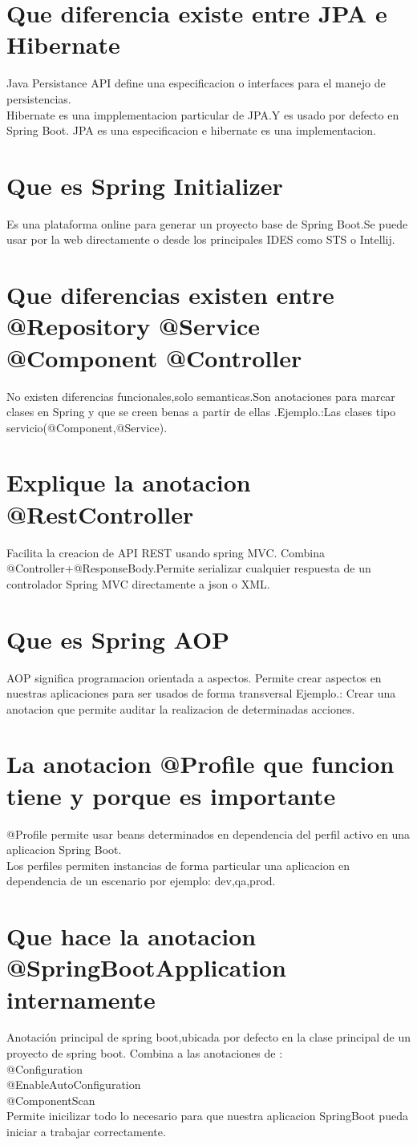 \section{Que diferencia existe entre JPA e Hibernate}
Java Persistance API define una especificacion o interfaces para el manejo de persistencias.\\
Hibernate es una impplementacion particular de JPA.Y es usado por defecto en Spring Boot.
JPA es una especificacion e hibernate es una implementacion.
\section{Que es Spring Initializer}
Es una plataforma online para generar un proyecto base de Spring Boot.Se puede usar por la web
directamente o desde los principales IDES como STS o Intellij.
\section{Que diferencias existen entre @Repository @Service
	@Component @Controller}
No existen diferencias funcionales,solo semanticas.Son anotaciones para marcar clases en Spring y que se creen benas a partir de ellas .Ejemplo.:Las clases tipo servicio(@Component,@Service).
\section{Explique la anotacion @RestController}
Facilita la creacion de API REST usando spring MVC.
Combina @Controller+@ResponseBody.Permite serializar cualquier respuesta de un controlador
Spring MVC directamente a json o XML.
\section{Que es Spring AOP}
AOP significa programacion orientada a aspectos.
Permite crear aspectos en nuestras aplicaciones para ser usados de forma transversal
Ejemplo.: Crear una anotacion que permite auditar la realizacion  de determinadas acciones.
\section{La anotacion @Profile que funcion tiene y porque es importante}
@Profile permite usar beans determinados en dependencia del perfil activo en una aplicacion Spring Boot.\\
Los perfiles permiten instancias de forma particular una aplicacion en dependencia de un escenario por ejemplo: dev,qa,prod.
\section{Que hace la anotacion @SpringBootApplication internamente}
Anotaci\'on principal de spring boot,ubicada por defecto en la clase principal de un proyecto de spring boot.
Combina a las anotaciones de :\\
 @Configuration\\
 @EnableAutoConfiguration\\
 @ComponentScan\\
Permite inicilizar todo lo necesario para que nuestra aplicacion SpringBoot pueda iniciar a trabajar correctamente.
